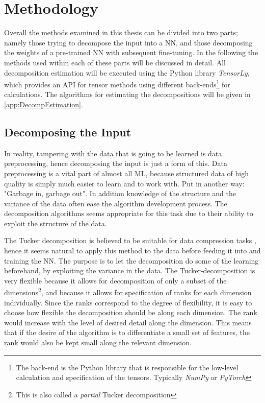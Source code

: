 \section{Methodology}
Overall the methods examined in this thesis can be divided into two parts; namely those trying to decompose the input into a NN, and those decomposing the weights of a pre-trained NN with subsequent fine-tuning. In the following the methods used within each of these parts will be discussed in detail. All decomposition estimation will be executed using the Python library \textit{TensorLy}\cite{tensorly}, which provides an API for tensor methods using different back-ends\footnote{The back-end is the Python library that is responsible for the low-level calculation and specification of the tensors. Typically \textit{NumPy}\cite{numpy} or \textit{PyTorch}\cite{pytorch}} for calculations. The algorithms for estimating the decompositions will be given in \autoref{app:DecompEstimation}. 

\subsection{Decomposing the Input}
In reality, tampering with the data that is going to be learned is data preprocessing, hence decomposing the input is just a form of this. Data preprocessing is a vital part of almost all ML, because structured data of high quality is simply much easier to learn and to work with. Put in another way: "Garbage in, garbage out". In addition knowledge of the structure and the variance of the data often ease the algorithm development process. The decomposition algorithms seems appropriate for this task due to their ability to exploit the structure of the data. 

The Tucker decomposition is believed to be suitable for data compression tasks \cite{Mørup2011}, hence it seems natural to apply this method to the data before feeding it into and training the NN. The purpose is to let the decomposition do some of the learning beforehand, by exploiting the variance in the data. The Tucker-decomposition is very flexible because it allows for decomposition of only a subset of the dimensions\footnote{This is also called a \textit{partial} Tucker decomposition}, and because it allows for specification of ranks for each dimension individually. Since the ranks correspond to the degree of flexibility, it is easy to choose how flexible the decomposition should be along each dimension. The rank would increase with the level of desired detail along the dimension. This means that if the desire of the algorithm is to differentiate a small set of features, the rank would also be kept small along the relevant dimension.

